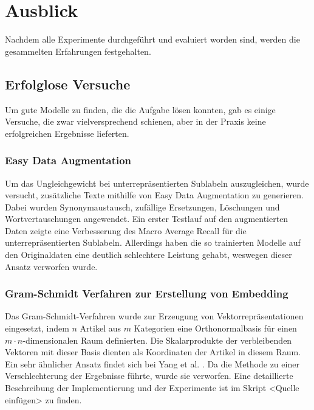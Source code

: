 \section{Ausblick}
\label{Ausblick}
Nachdem alle Experimente durchgeführt und evaluiert worden sind, werden die gesammelten Erfahrungen festgehalten.

\subsection{Erfolglose Versuche}
Um gute Modelle zu finden, die die Aufgabe lösen konnten, gab es einige Versuche, die zwar vielversprechend schienen, aber in der Praxis keine erfolgreichen Ergebnisse lieferten.

\subsubsection{Easy Data Augmentation}
\label{EDA}
Um das Ungleichgewicht bei unterrepräsentierten Sublabeln auszugleichen, wurde versucht, zusätzliche Texte mithilfe von Easy Data Augmentation \cite{Wei2019} zu generieren. Dabei wurden Synonymaustausch, zufällige Ersetzungen, Löschungen und Wortvertauschungen angewendet. Ein erster Testlauf  auf den augmentierten Daten zeigte eine Verbesserung  des Macro Average Recall für die unterrepräsentierten Sublabeln. Allerdings haben die so trainierten Modelle auf den Originaldaten eine deutlich schlechtere Leistung gehabt, weswegen dieser Ansatz verworfen wurde.

\subsubsection{Gram-Schmidt Verfahren zur Erstellung von Embedding}
Das Gram-Schmidt-Verfahren wurde zur Erzeugung von Vektorrepräsentationen eingesetzt, indem $n$ Artikel aus $m$ Kategorien eine Orthonormalbasis für einen $m\cdot n$-dimensionalen Raum definierten. Die Skalarprodukte der verbleibenden Vektoren mit dieser Basis dienten als Koordinaten der Artikel in diesem Raum. Ein sehr ähnlicher Ansatz findet sich bei Yang et al. \cite{Yang2019}. Da die Methode zu einer Verschlechterung der Ergebnisse führte, wurde sie verworfen. Eine detaillierte Beschreibung der Implementierung und der Experimente ist im Skript <Quelle einfügen> zu finden.

